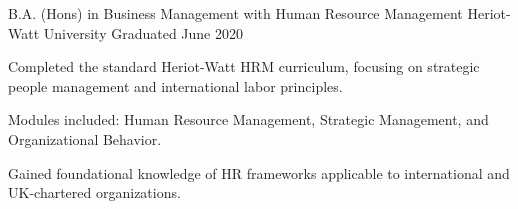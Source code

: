 
\begin{cventries}

  \cventry
    {B.A. (Hons) in Business Management with Human Resource Management} %
    {Heriot-Watt University} %
    {} %
    {Graduated June 2020} %
    {
      \begin{cvitems}
        \item Completed the standard Heriot-Watt HRM curriculum, focusing on strategic people management and international labor principles.
        \item Modules included: Human Resource Management, Strategic Management, and Organizational Behavior.
        \item Gained foundational knowledge of HR frameworks applicable to international and UK-chartered organizations.
      \end{cvitems}
    }
\end{cventries}